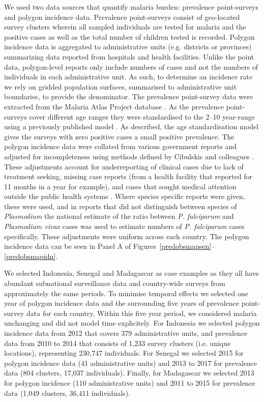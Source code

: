 \documentclass{statsoc}
\begin{document}
We used two data sources that quantify malaria burden: prevalence point-surveys and polygon incidence data.
Prevalence point-surveys consist of geo-located survey clusters wherein all sampled individuals are tested for malaria and the positive cases as well as the total number of children tested is recorded. 
Polygon incidence data is aggregated to administrative units (e.g. districts or provinces) summarizing data reported from hospitals and health facilities. 
Unlike the point data, polygon-level reports only include numbers of cases and not the numbers of individuals in each administrative unit.  
As such, to determine an incidence rate we rely on gridded population surfaces, summarised to administrative unit boundaries, to provide the denominator. 
The prevalence point-survey data were extracted from the Malaria Atlas Project database \citep{bhatt2015effect, guerra2007assembling, pfeffer2018ma}. 
As the prevalence point-surveys cover different age ranges they were standardised to the 2--10 year-range using a previously published model \citep{smith2007standardizing}. 
As described, the age standardisation model gives the surveys with zero positive cases a small positive prevalence. 
The polygon incidence data were collated from various government reports and adjusted for incompleteness using methods defined by Cibulskis and colleagues \citep{cibulskis2011worldwide, weiss2019mapping}. 
These adjustments account for underreporting of clinical cases due to lack of treatment seeking, missing case reports (from a health facility that reported for 11 months in a year for example), and cases that sought medical attention outside the public health systems \citep{battle2016treatment}. 
Where species specific reports were given, these were used, and in reports that did not distinguish between species of \emph{Plasmodium} the national estimate of the ratio between \emph{P. falciparum} and \emph{Plasmodium vivax} cases was used to estimate numbers of \emph{P. falciparum} cases specifically. 
These adjustments were uniform across each country. 
The polygon incidence data can be seen in Panel A of Figures~\ref{predobsmapsen}--\ref{predobsmapidn}.


We selected Indonesia, Senegal and Madagascar as case examples as they all have abundant subnational surveillance data and country-wide surveys from approximately the same periods.
To minimise temporal effects we selected one year of polygon incidence data and the surrounding five years of prevalence point-survey data for each country.
Within this five year period, we considered malaria unchanging and did not model time explicitely.
For Indonesia we selected polygon incidence data from 2012 that covers 379 administrative units, and prevalence data from 2010 to 2014 that consists of 1,233 survey clusters (i.e. unique locations), representing 230,747 individuals.
For Senegal we selected 2015 for polygon incidence data (41 administrative units) and 2013 to 2017 for prevalence data (804 clusters, 17,037 individuals).
Finally, for Madagascar we selected 2013 for polygon incidence (110 administrative units) and 2011 to 2015 for prevalence data (1,049 clusters, 36,411 individuals).
\end{document}
